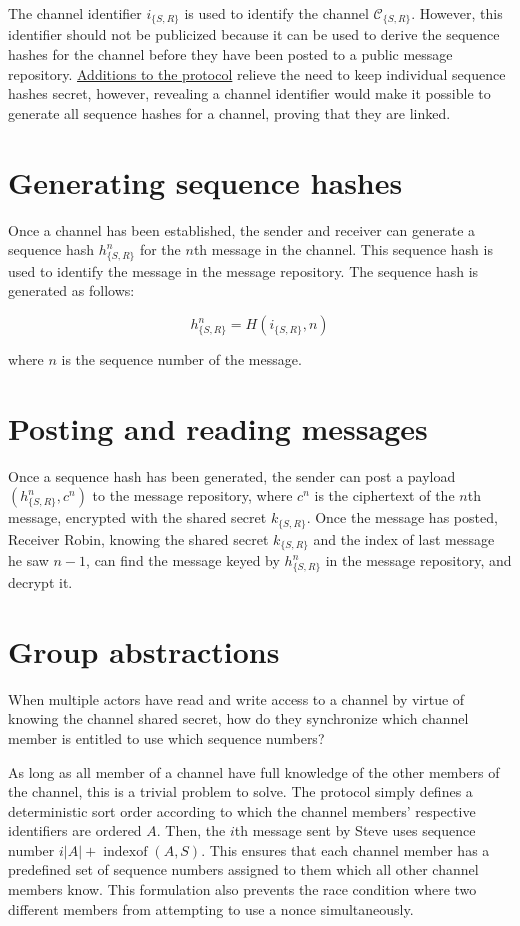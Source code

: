 The channel identifier $i_{\{S,R\}}$ is used to identify the channel $\mathcal{C}_{\{S,R\}}$. However, this identifier should not be publicized because it can be used to derive the sequence hashes for the channel before they have been posted to a public message repository. \hyperref[ensuring-proxy-honesty]{Additions to the protocol} relieve the need to keep individual sequence hashes secret, however, revealing a channel identifier would make it possible to generate all sequence hashes for a channel, proving that they are linked.

\section{Generating sequence hashes}\label{generating-sequence-hashes}

Once a channel has been established, the sender and receiver can generate a sequence hash $h_{\{S,R\}}^n$ for the $n$th message in the channel. This sequence hash is used to identify the message in the message repository. The sequence hash is generated as follows:

$$ h_{\{S,R\}}^n = H(i_{\{S,R\}}, n) $$

where $n$ is the sequence number of the message.

\section{Posting and reading messages}\label{posting-and-reading-messages}

Once a sequence hash has been generated, the sender can post a payload $(h_{\{S,R\}}^n, c^n)$ to the message repository, where $c^n$ is the ciphertext of the $n$th message, encrypted with the shared secret $k_{\{S,R\}}$. Once the message has posted, Receiver Robin, knowing the shared secret $k_{\{S,R\}}$ and the index of last message he saw $n-1$, can find the message keyed by $h_{\{S,R\}}^n$ in the message repository, and decrypt it.

\section{Group abstractions}\label{group-abstractions}

When multiple actors have read and write access to a channel by virtue of knowing the channel shared secret, how do they synchronize which channel member is entitled to use which sequence numbers?

As long as all member of a channel have full knowledge of the other members of the channel, this is a trivial problem to solve. The protocol simply defines a deterministic sort order according to which the channel members' respective identifiers are ordered $A$. Then, the $i$th message sent by Steve uses sequence number $i \lvert A \rvert + \operatorname{indexof}(A, S)$. This ensures that each channel member has a predefined set of sequence numbers assigned to them which all other channel members know. This formulation also prevents the race condition where two different members from attempting to use a nonce simultaneously.

